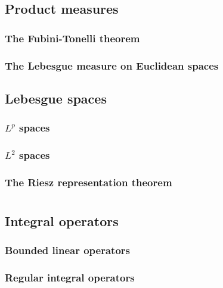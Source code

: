 \documentclass{../note}
\begin{document}
\chapter{Product measures}
\section{The Fubini-Tonelli theorem}
\section{The Lebesgue measure on Euclidean spaces}

\chapter{Lebesgue spaces}
\section{$L^p$ spaces}
\section{$L^2$ spaces}
\section{The Riesz representation theorem}



\part{}

\chapter{}

\chapter{}



\chapter{Integral operators}
\section{Bounded linear operators}
\section{Regular integral operators}
\end{document}

